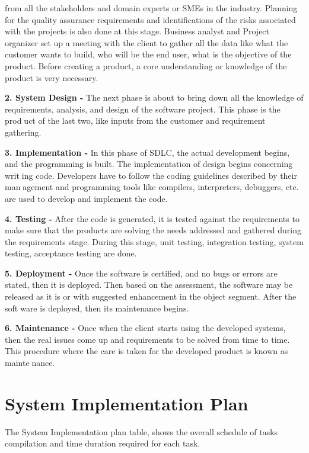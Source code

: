 \documentclass[oneside,a4paper,12pt]{report}
\begin{document}
from all the stakeholders and domain experts or SMEs in the industry. Planning for
the quality assurance requirements and identifications of the risks associated with
the projects is also done at this stage. Business analyst and Project organizer set up
a meeting with the client to gather all the data like what the customer wants to build,
who will be the end user, what is the objective of the product. Before creating a
product, a core understanding or knowledge of the product is very necessary.
\item\textbf{2. System Design -} The next phase is about to bring down all the knowledge
of requirements, analysis, and design of the software project. This phase is the product of the last two, like inputs from the customer and requirement gathering.
\item\textbf{3. Implementation -} In this phase of SDLC, the actual development begins,
and the programming is built. The implementation of design begins concerning writing code. Developers have to follow the coding guidelines described by their management and programming tools like compilers, interpreters, debuggers, etc. are
used to develop and implement the code.
\item\textbf{4. Testing - }After the code is generated, it is tested against the requirements
to make sure that the products are solving the needs addressed and gathered during
the requirements stage. During this stage, unit testing, integration testing, system
testing, acceptance testing are done.
\item\textbf{5. Deployment - }Once the software is certified, and no bugs or errors are
stated, then it is deployed. Then based on the assessment, the software may be
released as it is or with suggested enhancement in the object segment. After the software is deployed, then its maintenance begins.
\item\textbf{6. Maintenance -} Once when the client starts using the developed systems,
then the real issues come up and requirements to be solved from time to time. This
procedure where the care is taken for the developed product is known as maintenance.

\section{System Implementation Plan}

The System Implementation plan table, shows the overall schedule of tasks compilation and
time duration required for each task.
\end{document}
